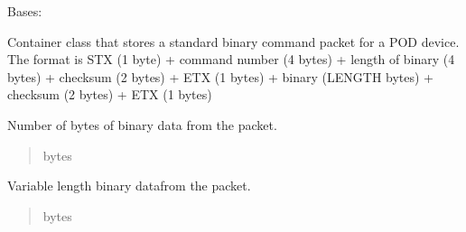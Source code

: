 \documentclass[letterpaper,10pt,english]{sphinxmanual}
\begin{document}
\begin{fulllineitems}
\label{\detokenize{Morelia.Packets:Morelia.Packets.Binary.PacketBinary}}
\pysigstartsignatures
{}
\pysigstopsignatures
\sphinxAtStartPar
Bases: {\hyperref[\detokenize{Morelia.Packets:Morelia.Packets.Packet.Packet}]{}}

\sphinxAtStartPar
Container class that stores a standard binary command packet for a POD device. The format is     STX (1 byte) + command number (4 bytes) + length of binary (4 bytes) + checksum (2 bytes)     + ETX (1 bytes) + binary (LENGTH bytes) + checksum (2 bytes) + ETX (1 bytes)

\begin{fulllineitems}
\label{\detokenize{Morelia.Packets:Morelia.Packets.Binary.PacketBinary.binaryLength}}
\pysigstartsignatures
{}
\pysigstopsignatures
\sphinxAtStartPar
Number of bytes of binary data from the packet.
\begin{quote}\begin{description}
\sphinxAtStartPar
bytes

\end{description}\end{quote}

\end{fulllineitems}


\begin{fulllineitems}
\label{\detokenize{Morelia.Packets:Morelia.Packets.Binary.PacketBinary.binaryData}}
\pysigstartsignatures
{}
\pysigstopsignatures
\sphinxAtStartPar
Variable length binary datafrom the packet.
\begin{quote}\begin{description}
\sphinxAtStartPar
bytes


\end{description}
\end{quote}
\end{fulllineitems}
\end{fulllineitems}
\end{document}
